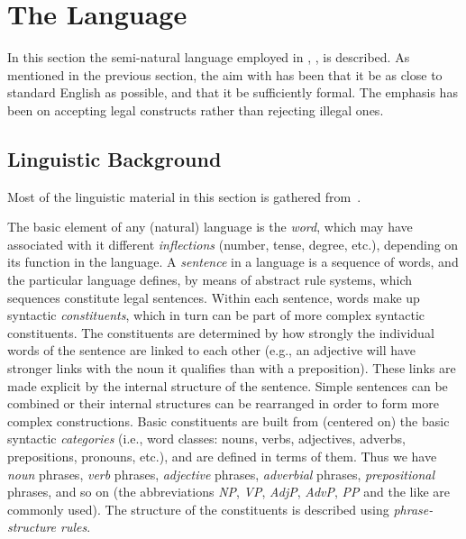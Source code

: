 
\section{The Language}
\label{def}

In this section the semi-natural language employed in {\nash}, {\nal},
is described. As mentioned in the previous section, the aim with
{\nal} has been that it be as close to standard English as possible,
and that it be sufficiently formal. The emphasis has been on accepting
legal constructs rather than rejecting illegal ones.

\subsection{Linguistic Background}
\label{ling}

Most of the linguistic material in this section is gathered
from~\cite{gal}. 

The basic element of any (natural) language is the {\em word\/}, which
may have associated with it different {\em inflections\/} (number,
tense, degree, etc.), depending on its function in the language. A
{\em sentence\/} in a language is a sequence of words, and the
particular language defines, by means of abstract rule systems, which
sequences constitute legal sentences.  Within each sentence, words
make up syntactic {\em constituents\/}, which in turn can be part of
more complex syntactic constituents. The constituents are determined
by how strongly the individual words of the sentence are linked to
each other (e.g., an adjective will have stronger links with the noun
it qualifies than with a preposition). These links are made explicit
by the internal structure of the sentence. Simple sentences can be
combined or their internal structures can be rearranged in order to
form more complex constructions. Basic constituents are built from
(centered on) the basic syntactic {\em categories\/} (i.e., word
classes: nouns, verbs, adjectives, adverbs, prepositions, pronouns,
etc.), and are defined in terms of them. Thus we have {\em noun\/}
phrases, {\em verb\/} phrases, {\em adjective\/} phrases, {\em
adverbial\/} phrases, {\em prepositional\/} phrases, and so on (the
abbreviations {\sl NP\/}, {\sl VP\/}, {\sl AdjP\/}, {\sl AdvP\/}, {\sl
PP\/} and the like are commonly used). The structure of the
constituents is described using {\em phrase-structure rules\/}.

